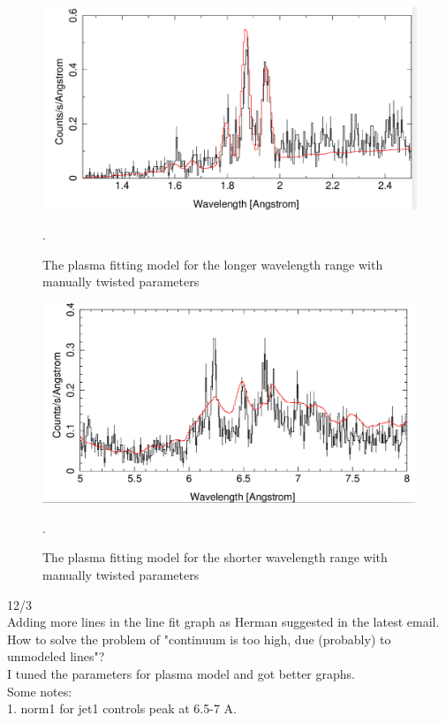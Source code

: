  \newpage
\begin{figure}[h!]
    \centering
    \includegraphics[width=0.9\linewidth]{Chapters/Figures/short_wavelength.png}
    \caption{The plasma fitting model for the longer wavelength range with manually twisted parameters}.
    \label{fig:manual_long}
\end{figure}

\begin{figure}[h!]
    \centering
    \includegraphics[width=0.9\linewidth]{Chapters/Figures/long_wavelength.png}
    \caption{The plasma fitting model for the shorter wavelength range with manually twisted parameters}.
    \label{fig:manual_short}
\end{figure}


12/3\\
Adding more lines in the line fit graph as Herman suggested in the latest email.\\
How to solve the problem of "continuum is too high, due (probably) to unmodeled lines"?\\

I tuned the parameters for plasma model and got better graphs.\\
Some notes:\\
1. norm1 for jet1 controls peak at 6.5-7 A.\\

